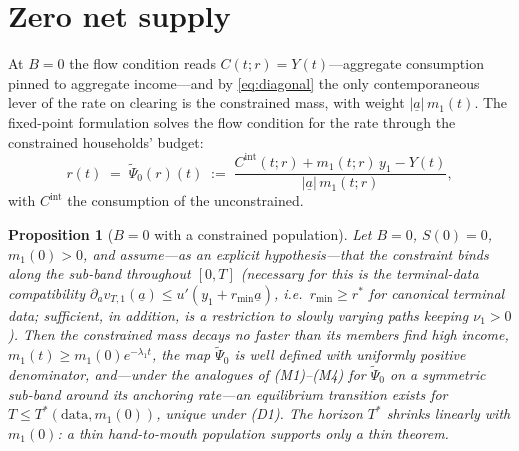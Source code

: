 \documentclass[11pt]{article}
\newtheorem{proposition}[theorem]{Proposition}
\theoremstyle{definition}
\theoremstyle{remark}
\newcommand{\ubar}[1]{\underline{#1}}
\newcommand{\uba}{\ubar{a}}
\begin{document}
\section{Zero net supply}
\label{sec:B0}

At $B=0$ the flow condition reads $C(t;r)=Y(t)$---aggregate
consumption pinned to aggregate income---and by \eqref{eq:diagonal}
the only contemporaneous lever of the rate on clearing is the
constrained mass, with weight $|\uba|\,m_1(t)$. The fixed-point
formulation solves the flow condition for the rate through the
constrained households' budget:
\[
r(t)\;=\;\widetilde\Psi_0(r)(t)\;:=\;
\frac{C^{\mathrm{int}}(t;r)+m_1(t;r)\,y_1-Y(t)}
{|\uba|\,m_1(t;r)},
\]
with $C^{\mathrm{int}}$ the consumption of the unconstrained.

\begin{proposition}[$B=0$ with a constrained population]
\label{prop:B0atom}
Let $B=0$, $S(0)=0$, $m_1(0)>0$, and assume---as an explicit
hypothesis---that the constraint binds along the sub-band throughout
$[0,T]$ (necessary for this is the terminal-data compatibility
$\partial_a v_{T,1}(\uba)\le u'(y_1+r_{\min}\uba)$, i.e.\
$r_{\min}\ge r^*$ for canonical terminal data; sufficient, in
addition, is a restriction to slowly varying paths keeping
$\nu_1>0$). Then the constrained mass decays no faster than its
members find high income, $m_1(t)\ge m_1(0)e^{-\lambda_1t}$, the map
$\widetilde\Psi_0$ is well defined with uniformly positive
denominator, and---under the analogues of (M1)--(M4) for
$\widetilde\Psi_0$ on a symmetric sub-band around its anchoring
rate---an equilibrium transition exists for
$T\le T^*(\mathrm{data},m_1(0))$, unique under (D1). The horizon
$T^*$ shrinks linearly with $m_1(0)$: a thin hand-to-mouth population
supports only a thin theorem.
\end{proposition}
\end{document}

